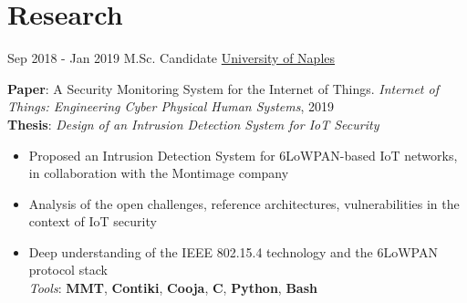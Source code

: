 \documentclass[letterpaper]{twentysecondcv} %
\begin{document}
\section{Research}
\begin{twenty}
	\twentyitem
    	{Sep 2018 -}
		{Jan 2019}
        {M.Sc. Candidate}
        {\href{http://www.scuolapsb.unina.it/}{University of Naples}}
        {}
        {
       	\textbf{Paper}: A Security Monitoring System for the Internet of Things.  \textit{Internet of Things: Engineering Cyber Physical Human Systems}, 2019 \\
       	\textbf{Thesis}: \textit{Design of an Intrusion Detection System for IoT Security}
        {
            \begin{itemize}
                \item Proposed an Intrusion Detection System for 6LoWPAN-based IoT networks, in collaboration with the Montimage company
                \item Analysis of the open challenges, reference architectures, vulnerabilities in the context of IoT security
                \item Deep understanding of the IEEE 802.15.4 technology and the 6LoWPAN protocol stack \\
                \textit{Tools}: \textbf{MMT}, \textbf{Contiki}, \textbf{Cooja}, \textbf{C}, \textbf{Python}, \textbf{Bash}
		    \end{itemize}}
        }
\end{twenty}
%
%
\end{document}
